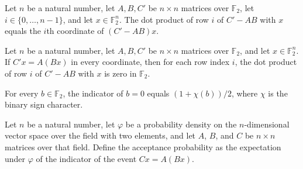 \begin{theorem}
\leanok
{}
Let $n$ be a natural number, let $A,B,C'$ be $n\times n$ matrices over $\mathbb F_2$,
let $i\in\{0,\ldots,n-1\}$, and let $x\in\mathbb F_2^n$. The dot product of row $i$ of
$C'-AB$ with $x$ equals the $i$th coordinate of $(C'-AB)x$.
\end{theorem}

\begin{theorem}
\label{FABL.matrixProductVerificationPredicate_imp_row_dot_eq_zero}
\leanok
{}
Let $n$ be a natural number, let $A,B,C'$ be $n\times n$ matrices over $\mathbb{F}_2$,
and let $x\in\mathbb{F}_2^n$. If $C'x=A(Bx)$ in every coordinate, then for each row
index $i$, the dot product of row $i$ of $C'-AB$ with $x$ is zero in $\mathbb{F}_2$.
\end{theorem}

\begin{theorem}
\leanok
{}
For every $b\in\mathbb F_2$, the indicator of $b=0$ equals $(1+\chi(b))/2$, where $\chi$
is the binary sign character.
\end{theorem}

\begin{definition}
\label{FABL.matrixProductVerificationAcceptanceProbability}
\leanok
{}
Let $n$ be a natural number, let $\varphi$ be a probability density on the
$n$-dimensional vector space over the field with two elements, and let $A$, $B$, and $C$
be $n\times n$ matrices over that field. Define the acceptance probability as the
expectation under $\varphi$ of the indicator of the event $Cx=A(Bx)$.
\end{definition}

